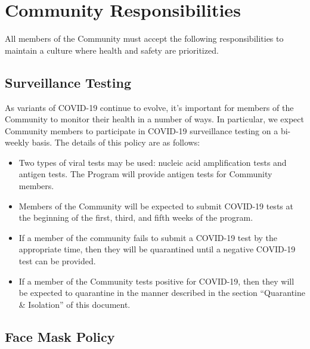 \documentclass{ross}
\begin{document}
\section*{Community Responsibilities}

All members of the Community must accept the following responsibilities to maintain a culture where health and safety are prioritized.

\subsection*{Surveillance Testing}

As variants of COVID-19 continue to evolve, it's important for members of the Community to monitor their health in a number of ways. In particular, we expect Community members to participate in COVID-19 surveillance testing on a bi-weekly basis. The details of this policy are as follows:

\begin{itemize}
    \item Two types of viral tests may be used: nucleic acid amplification tests and antigen tests. The Program will provide antigen tests for Community members.
    \item Members of the Community will be expected to submit COVID-19 tests at the beginning of the first, third, and fifth weeks of the program. 
    \item If a member of the community fails to submit a COVID-19 test by the appropriate time, then they will be quarantined until a negative COVID-19 test can be provided. 
    \item If a member of the Community tests positive for COVID-19, then they will be expected to quarantine in the manner described in the section ``Quarantine \& Isolation'' of this document.
\end{itemize}


\subsection*{Face Mask Policy}
\end{document}
